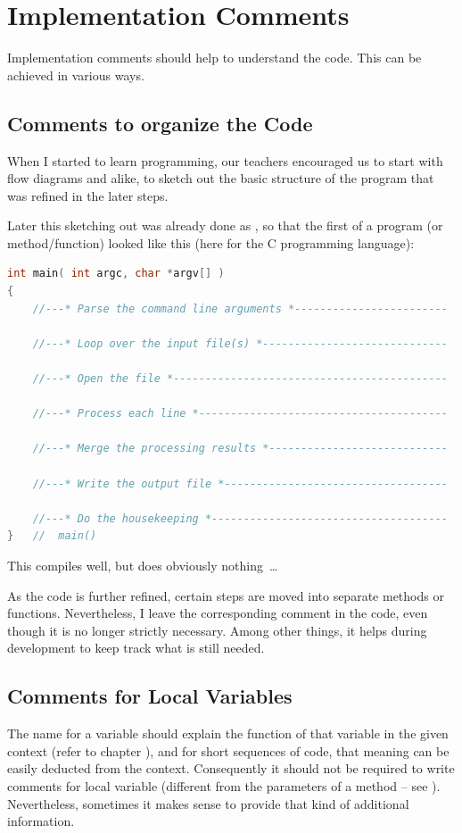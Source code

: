 \chapter{Implementation Comments}\label{sec:ImplementationComments}
Implementation comments should help to understand the code. This can be achieved in various ways.

\section{Comments to organize the Code}
When I started to learn programming, our teachers encouraged us to start with flow diagrams and alike, to sketch out the basic structure of the program that was refined in the later steps.

Later this sketching out was already done as , so that the first  of a program (or method/function) looked like this (here for the C programming language):
\begin{lstlisting}[language=C]
int main( int argc, char *argv[] )
{
    //---* Parse the command line arguments *------------------------
    
    //---* Loop over the input file(s) *-----------------------------
    
    //---* Open the file *-------------------------------------------
    
    //---* Process each line *---------------------------------------
    
    //---* Merge the processing results *----------------------------
    
    //---* Write the output file *-----------------------------------
    
    //---* Do the housekeeping *-------------------------------------
}   //  main()
\end{lstlisting}

This compiles well, but does obviously nothing~…

As the code is further refined, certain steps are moved into separate methods or functions. Nevertheless, I leave the corresponding comment in the code, even though it is no longer strictly necessary. Among other things, it helps during development to keep track what is still needed.


\section{Comments for Local Variables}\label{sec:LocalVariableComments}
The name for a variable should explain the function of that variable in the given context (refer to chapter ), and for short sequences of code, that meaning can be easily deducted from the context. Consequently it should not be required to write comments for local variable (different from the parameters of a method – see ). Nevertheless, sometimes it makes sense to provide that kind of additional information.


